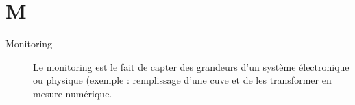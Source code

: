 \section{M}

\begin{description}

\item[Monitoring] Le monitoring est le fait de capter des grandeurs d'un système
électronique ou physique (exemple : remplissage d'une cuve et de les transformer
 en mesure numérique.

\end{description}


